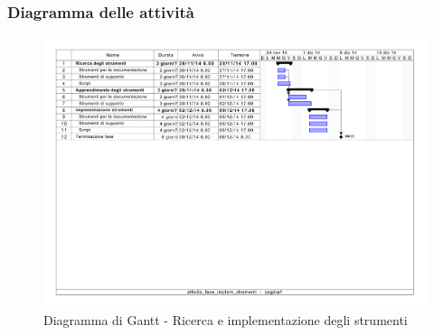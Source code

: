 		\subsubsection{Diagramma delle attività} %
		\label{ssub:diagramma_delle_attivita}
			\begin{figure}[htbp]
				\centerline{\includegraphics[scale=0.7]{images/d_attivita_fase_implem_strumenti.pdf}}
				\caption{Diagramma di Gantt - Ricerca e implementazione degli strumenti}
				\label{fig:gantt_ricerca_e_implementazione_strumenti}				
			\end{figure}
	
